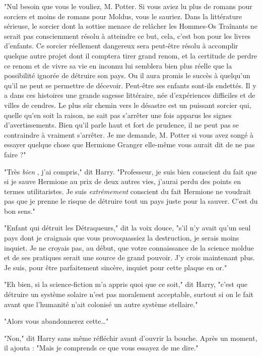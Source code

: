 "Nul besoin que vous le vouliez, M. Potter. Si vous aviez lu plus de romans pour sorciers et moins de romans pour Moldus, vous le sauriez. Dans la littérature sérieuse, le sorcier dont la sottise menace de relâcher les Hommes-Os Traînants ne serait pas consciemment résolu à atteindre ce but, cela, c'est bon pour les livres d'enfants. Ce sorcier réellement dangereux sera peut-être résolu à accomplir quelque autre projet dont il comptera tirer grand renom, et la certitude de perdre ce renom et de vivre sa vie en inconnu lui semblera bien plus réelle que la possibilité ignorée de détruire son pays. Ou il aura promis le succès à quelqu'un qu'il ne peut se permettre de décevoir. Peut-être ses enfants sont-ils endettés. Il y a dans ces histoires une grande sagesse littéraire, née d'expériences difficiles et de villes de cendres. Le plus sûr chemin vers le désastre est un puissant sorcier qui, quelle qu'en soit la raison, ne sait pas s'arrêter une fois apparus les signes d'avertissements. Bien qu'il parle haut et fort de prudence, il ne peut pas se contraindre à vraiment s'arrêter. Je me demande, M. Potter si vous avez songé à essayer quelque chose que Hermione Granger elle-même vous aurait dit de ne pas faire ?"

"Très \emph{bien} , j'ai compris," dit Harry. "Professeur, je suis bien conscient du fait que si je sauve Hermione au prix de deux autres vies, j'aurai perdu des points en termes utilitaristes. Je suis \emph{extrêmement}  conscient du fait Hermione ne voudrait pas que je prenne le risque de détruire tout un pays juste pour la sauver. C'est du bon sens."

"Enfant qui détruit les Détraqueurs," dit la voix douce, "s'il n'y avait qu'un seul pays dont je craignais que vous provoquassiez la destruction, je serais moins inquiet. Je ne croyais pas, au début, que votre connaissance de la science moldue et de ses pratiques serait une source de grand pouvoir. J'y crois maintenant plus. Je suis, pour être parfaitement sincère, inquiet pour cette plaque en or."

"Eh bien, si la science-fiction m'a appris quoi que ce soit," dit Harry, "c'est que détruire un système solaire n'est pas moralement acceptable, surtout si on le fait avant que l'humanité n'ait colonisé un autre système stellaire."

"Alors vous abandonnerez cette…"

"Non," dit Harry sans même réfléchir avant d'ouvrir la bouche. Après un moment, il ajouta : "Mais je comprends ce que vous essayez de me dire."

